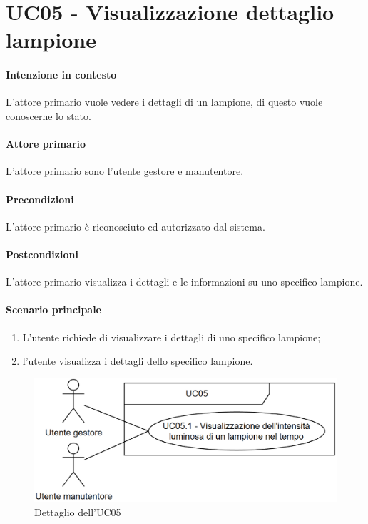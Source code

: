\section{UC05 - Visualizzazione dettaglio lampione}\label{uc:05}
\paragraph{Intenzione in contesto} L'attore primario vuole vedere i dettagli di un lampione, di questo vuole conoscerne lo stato.
\paragraph{Attore primario} L'attore primario sono l'utente gestore e manutentore.
\paragraph{Precondizioni} L'attore primario è riconosciuto ed autorizzato dal sistema.
\paragraph{Postcondizioni} L'attore primario visualizza i dettagli e le informazioni su uno specifico lampione.
\paragraph{Scenario principale}
\begin{enumerate}
    \item L'utente richiede di visualizzare i dettagli di uno specifico lampione;
    \item l'utente visualizza i dettagli dello specifico lampione.
\end{enumerate}

\begin{figure}[h]
    \includegraphics[width=\textwidth]{contenuti/img/casi_uso_grafici-uc05.png}
    \caption{Dettaglio dell'UC05}
    \label{fig:uc05}
\end{figure}

